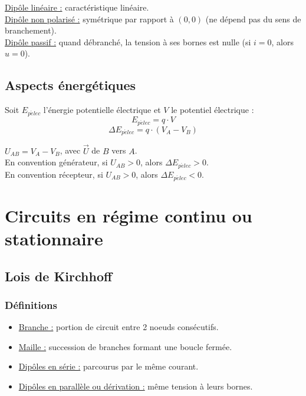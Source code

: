 \documentclass[13pt, twoside, a4paper, french]{report}
\begin{document}
            \underline{Dipôle linéaire :} caractéristique linéaire.\\
            \underline{Dipôle non polarisé :} symétrique par rapport à $(0, 0)$ (ne dépend pas du sens de branchement).\\
            \underline{Dipôle passif :} quand débranché, la tension à ses bornes est nulle (si $i = 0$, alors $u = 0$).\\
        
        
        \section{Aspects énergétiques}\label{sec:aspects-energetiques}
            
            Soit $E_{p\acute elec}$ l'énergie potentielle électrique et $V$ le potentiel électrique :
            \begin{equation}
                E_{p\acute elec} = q \cdot V\label{eq:equation1}
            \end{equation}
            \begin{equation}
                \Delta E_{p\acute elec} = q \cdot (V_A - V_B) \label{eq:equation2}
            \end{equation}
            
            $U_{AB} = V_A - V_B$, avec $\vec U$ de $B$ vers $A$.\\
            En convention générateur, si $U_{AB} > 0$, alors $\Delta E_{p\acute elec} > 0$.\\
            En convention récepteur, si $U_{AB} > 0$, alors $\Delta E_{p\acute elec} < 0$.
    
    
    \chapter{Circuits en régime continu ou stationnaire}\label{ch:circuits-en-regime-continu-ou-stationnaire}
        
        
        \section{Lois de Kirchhoff}\label{sec:lois-de-kirchhoff}
            
            \subsection{Définitions}\label{subsec:definitions}
                \begin{itemize}
                    \item \underline{Branche :} portion de circuit entre 2 noeuds consécutifs.
                    \item \underline{Maille :} succession de branches formant une boucle fermée.
                    \item \underline{Dipôles en série :} parcourus par le même courant.
                    \item \underline{Dipôles en parallèle ou dérivation :} même tension à leurs bornes.
                \end{itemize}
            
\end{document}
